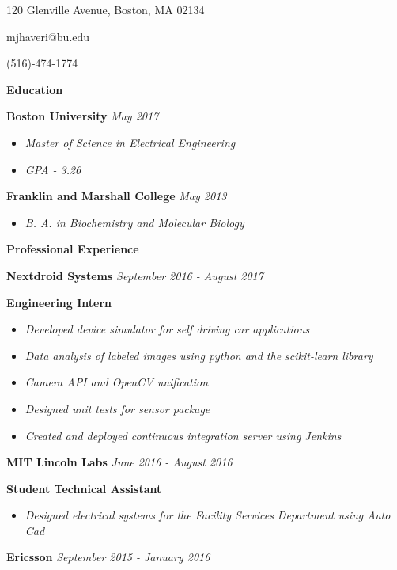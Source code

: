 \documentclass[8pt]{extarticle}
\begin{document}
\begin{center} 

120 Glenville Avenue, Boston, MA 02134

mjhaveri@bu.edu 

(516)-474-1774 
\end{center} 
\begin{changemargin}{-0.8cm}{0.0cm}
\textbf{Education}
\end{changemargin}
\vspace*{-0.4cm}
\makebox[\linewidth]{\rule{17cm}{0.4pt}}
\textbf{Boston University} \textit{May 2017}
\begin{itemize}
\item \textit{Master of Science in Electrical Engineering}
\item \textit{GPA - 3.26}
\end{itemize}
\textbf{Franklin and Marshall College} \textit{May 2013}
\begin{itemize}
\item \textit{B. A. in Biochemistry and Molecular Biology }

\end{itemize}

\begin{changemargin}{-0.8cm}{0.0cm}
\textbf{Professional Experience}
\end{changemargin}
\vspace*{-0.4cm}
\makebox[\linewidth]{\rule{17cm}{0.4pt}}
\textbf{Nextdroid Systems} \textit{September 2016 - August 2017}

{\tiny }
\textbf{Engineering Intern} 
\begin{itemize}
\item \textit{Developed device simulator for self driving car applications}
\item \textit{Data analysis of labeled images using python and the scikit-learn library}
\item \textit{Camera API and OpenCV unification}
\item \textit{Designed unit tests for sensor package}
\item \textit{Created and deployed continuous integration server using Jenkins}
\end{itemize}
\textbf{MIT Lincoln Labs} \textit{June  2016 - August 2016}

\textbf{Student Technical Assistant } 
\begin{itemize}
\item \textit{Designed electrical systems for the Facility Services Department using Auto Cad}
\end{itemize}
\textbf{Ericsson} \textit{September  2015 - January 2016}
\end{document}
